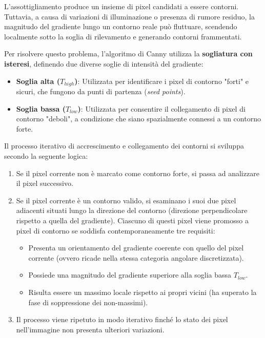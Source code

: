 ﻿\documentclass[11pt, a4paper]{article}
\begin{document}
L'assottigliamento produce un insieme di pixel candidati a essere contorni. Tuttavia, a causa di variazioni di illuminazione o presenza di rumore residuo, la magnitudo del gradiente lungo un contorno reale può fluttuare, scendendo localmente sotto la soglia di rilevamento e generando contorni frammentati.

Per risolvere questo problema, l'algoritmo di Canny utilizza la \textbf{sogliatura con isteresi}, definendo due diverse soglie di intensità del gradiente:
\begin{itemize}
    \item \textbf{Soglia alta ($T_{high}$)}: Utilizzata per identificare i pixel di contorno "forti" e sicuri, che fungono da punti di partenza (\emph{seed points}).
    \item \textbf{Soglia bassa ($T_{low}$)}: Utilizzata per consentire il collegamento di pixel di contorno "deboli", a condizione che siano spazialmente connessi a un contorno forte.
\end{itemize}

Il processo iterativo di accrescimento e collegamento dei contorni si sviluppa secondo la seguente logica:
\begin{enumerate}
    \item Se il pixel corrente non è marcato come contorno forte, si passa ad analizzare il pixel successivo.
    \item Se il pixel corrente è un contorno valido, si esaminano i suoi due pixel adiacenti situati lungo la direzione del contorno (direzione perpendicolare rispetto a quella del gradiente). Ciascuno di questi pixel viene promosso a pixel di contorno se soddisfa contemporaneamente tre requisiti:
    \begin{itemize}
        \item Presenta un orientamento del gradiente coerente con quello del pixel corrente (ovvero ricade nella stessa categoria angolare discretizzata).
        \item Possiede una magnitudo del gradiente superiore alla soglia bassa $T_{low}$.
        \item Risulta essere un massimo locale rispetto ai propri vicini (ha superato la fase di soppressione dei non-massimi).
    \end{itemize}
    \item Il processo viene ripetuto in modo iterativo finché lo stato dei pixel nell'immagine non presenta ulteriori variazioni.
\end{enumerate}
\end{document}
